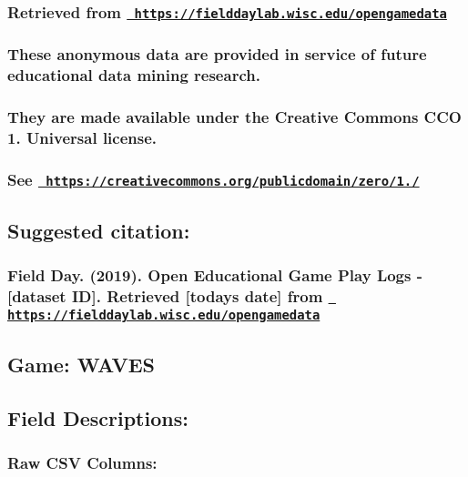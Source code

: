 \subsubsection*{Retrieved from \href{https://fielddaylab.wisc.edu/opengamedata}{\texttt{ https\+://fielddaylab.\+wisc.\+edu/opengamedata}}}

\subsubsection*{These anonymous data are provided in service of future educational data mining research.}

\subsubsection*{They are made available under the Creative Commons C\+CO 1. Universal license.}

\subsubsection*{See \href{https://creativecommons.org/publicdomain/zero/1.0/}{\texttt{ https\+://creativecommons.\+org/publicdomain/zero/1./}}}

\subsection*{Suggested citation\+:}

\subsubsection*{Field Day. (2019). Open Educational Game Play Logs -\/ \mbox{[}dataset ID\mbox{]}. Retrieved \mbox{[}today\textquotesingle{}s date\mbox{]} from \href{https://fielddaylab.wisc.edu/opengamedata}{\texttt{ https\+://fielddaylab.\+wisc.\+edu/opengamedata}}}

\subsection*{Game\+: W\+A\+V\+ES}

\subsection*{Field Descriptions\+:}

\subsubsection*{Raw C\+SV Columns\+:}


